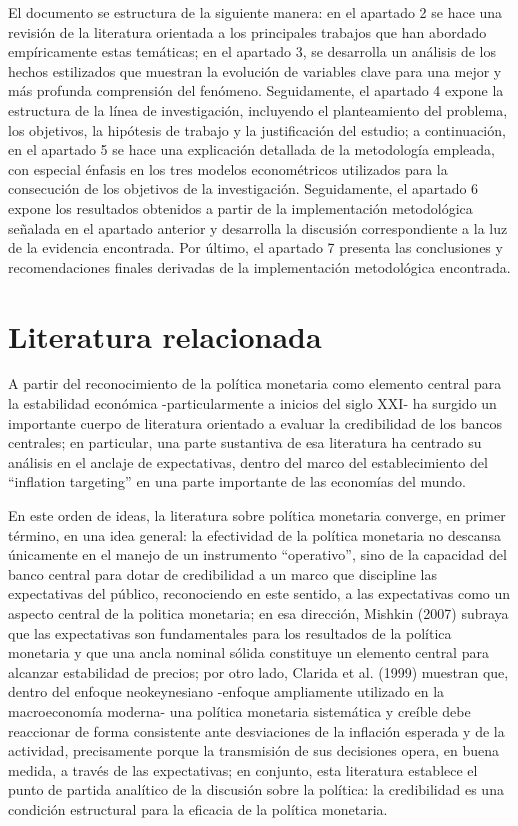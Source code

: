 \documentclass[
  10.5pt,
  letterpaper,
  twocolumn]{article}
\begin{document}
El documento se estructura de la siguiente manera: en el apartado 2 se
hace una revisión de la literatura orientada a los principales trabajos
que han abordado empíricamente estas temáticas; en el apartado 3, se
desarrolla un análisis de los hechos estilizados que muestran la
evolución de variables clave para una mejor y más profunda comprensión
del fenómeno. Seguidamente, el apartado 4 expone la estructura de la
línea de investigación, incluyendo el planteamiento del problema, los
objetivos, la hipótesis de trabajo y la justificación del estudio; a
continuación, en el apartado 5 se hace una explicación detallada de la
metodología empleada, con especial énfasis en los tres modelos
econométricos utilizados para la consecución de los objetivos de la
investigación. Seguidamente, el apartado 6 expone los resultados
obtenidos a partir de la implementación metodológica señalada en el
apartado anterior y desarrolla la discusión correspondiente a la luz de
la evidencia encontrada. Por último, el apartado 7 presenta las
conclusiones y recomendaciones finales derivadas de la implementación
metodológica encontrada.

\section{Literatura relacionada}\label{literatura-relacionada}

A partir del reconocimiento de la política monetaria como elemento
central para la estabilidad económica -particularmente a inicios del
siglo XXI- ha surgido un importante cuerpo de literatura orientado a
evaluar la credibilidad de los bancos centrales; en particular, una
parte sustantiva de esa literatura ha centrado su análisis en el anclaje
de expectativas, dentro del marco del establecimiento del ``inflation
targeting'' en una parte importante de las economías del mundo.

En este orden de ideas, la literatura sobre política monetaria converge,
en primer término, en una idea general: la efectividad de la política
monetaria no descansa únicamente en el manejo de un instrumento
``operativo'', sino de la capacidad del banco central para dotar de
credibilidad a un marco que discipline las expectativas del público,
reconociendo en este sentido, a las expectativas como un aspecto central
de la politica monetaria; en esa dirección, Mishkin (2007) subraya que
las expectativas son fundamentales para los resultados de la política
monetaria y que una ancla nominal sólida constituye un elemento central
para alcanzar estabilidad de precios; por otro lado, Clarida et al.
(1999) muestran que, dentro del enfoque neokeynesiano -enfoque
ampliamente utilizado en la macroeconomía moderna- una política
monetaria sistemática y creíble debe reaccionar de forma consistente
ante desviaciones de la inflación esperada y de la actividad,
precisamente porque la transmisión de sus decisiones opera, en buena
medida, a través de las expectativas; en conjunto, esta literatura
establece el punto de partida analítico de la discusión sobre la
política: la credibilidad es una condición estructural para la eficacia
de la política monetaria.
\end{document}
